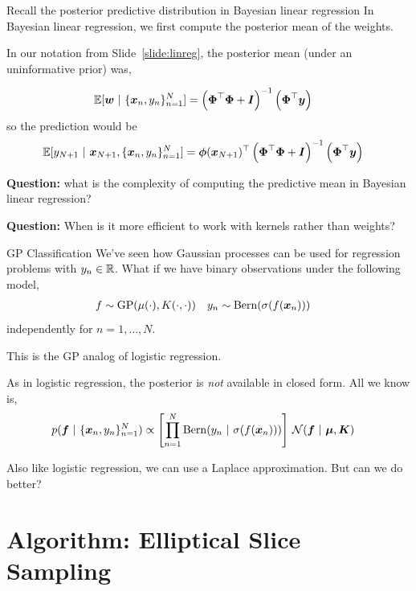 \documentclass[aspectratio=169]{beamer}
\begin{document}
\begin{frame}{Recall the posterior predictive distribution in Bayesian linear regression}
In Bayesian linear regression, we first compute the posterior mean of the weights.

In our notation from Slide~\ref{slide:linreg}, the posterior mean (under an uninformative prior) was,

\begin{align}
    \mathbb{E}[\boldsymbol{w} ~\vert~ \{\boldsymbol{x}_n, y_n\}_{n=1}^N] &= \left(\boldsymbol{\Phi}^\top \boldsymbol{\Phi} + \boldsymbol{I} \right)^{-1} \left(\boldsymbol{\Phi}^\top \boldsymbol{y} \right)
\end{align}
so the prediction would be
\begin{align}
    \mathbb{E}[y_{N+1} ~\vert~ \boldsymbol{x}_{N+1}, \{\boldsymbol{x}_n, y_n\}_{n=1}^N] &= \boldsymbol{\phi}(\boldsymbol{x}_{N+1})^\top \left(\boldsymbol{\Phi}^\top \boldsymbol{\Phi} + \boldsymbol{I}\right)^{-1} \left(\boldsymbol{\Phi}^\top \boldsymbol{y} \right)
\end{align}

\textbf{Question:} what is the complexity of computing the predictive mean in Bayesian linear regression?

\textbf{Question:} When is it more efficient to work with kernels rather than weights?
\end{frame}

\begin{frame}{GP Classification}
We've seen how Gaussian processes can be used for regression problems with $y_n \in \mathbb{R}$. What if we have binary observations under the following model,
\begin{align}
    f &\sim \mathrm{GP}(\mu(\cdot), K(\cdot, \cdot)) &
    y_n &\sim \mathrm{Bern}(\sigma(f(\boldsymbol{x}_n)))
\end{align}
independently for $n=1,\ldots,N$.

This is the GP analog of logistic regression.

As in logistic regression, the posterior is \textit{not} available in closed form. All we know is,
\begin{align}
    p(\boldsymbol{f} ~\vert~ \{\boldsymbol{x}_n, y_n\}_{n=1}^N)
    &\propto 
    \left[\prod_{n=1}^N \mathrm{Bern}(y_n ~\vert~ \sigma(f(\boldsymbol{x}_n))) \right] \, \mathcal{N}(\boldsymbol{f} ~\vert~ \boldsymbol{\mu}, \boldsymbol{K}) 
\end{align}

Also like logistic regression, we can use a Laplace approximation. But can we do better?

\end{frame}


\section{Algorithm: Elliptical Slice Sampling}
\label{sec:ess}
\end{document}
